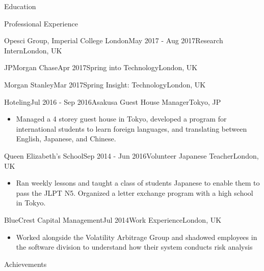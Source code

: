 \documentclass[10pt,a4paper]{xun-cv}
\begin{document}
\begin{section}{Education}
\begin{section}{Professional Experience}
\begin{rSubsection}{Opesci Group, Imperial College London}{May 2017 - Aug 2017}{Research Intern}{London, UK}
\begin{rSubsection}{JPMorgan Chase}{Apr 2017}{Spring into Technology}{London, UK}
\begin{rSubsection}{Morgan Stanley}{Mar 2017}{Spring Insight: Technology}{London, UK}

\begin{rSubsection}{Hoteling}{Jul 2016 - Sep 2016}{Asakusa Guest House Manager}{Tokyo, JP}
\begin{itemize}
    \item Managed a 4 storey guest house in Tokyo, developed a program for international students to learn foreign languages, and translating between English, Japanese, and Chinese.
\end{itemize}


\begin{rSubsection}{Queen Elizabeth's School}{Sep 2014 - Jun 2016}{Volunteer Japanese Teacher}{London, UK}
\begin{itemize}
    \item Ran weekly lessons and taught a class of students Japanese to enable them to pass the JLPT N5. Organized a letter exchange program with a high school in Tokyo.
\end{itemize}


\begin{rSubsection}{BlueCrest Capital Management}{Jul 2014}{Work Experience}{London, UK}
\begin{itemize}
    \item Worked alongside the Volatility Arbitrage Group and shadowed employees in the software division to understand how their system conducts risk analysis
\end{itemize}


\begin{section}{Achievements}


\end{section}
\end{rSubsection}
\end{rSubsection}
\end{rSubsection}
\end{rSubsection}
\end{rSubsection}
\end{rSubsection}
\end{section}
\end{section}
\end{document}
